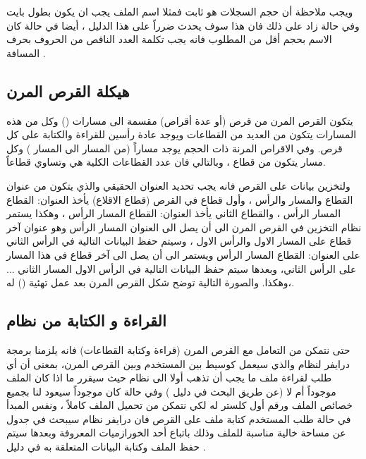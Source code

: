 \documentclass[document.tex]{subfiles}
\begin{document}
ويجب ملاحظة أن حجم السجلات هو ثابت  فمثلا اسم الملف يجب ان يكون بطول  بايت وفي حالة زاد على ذلك فان هذا سوف يحدث ضرراً على هذا الدليل ، أيضا في حالة كان الاسم بحجم أقل من المطلوب فانه يجب تكلمة العدد الناقص من الحروف بحرف المسافة .

\subsection{هيكلة القرص المرن}
يتكون القرص المرن من قرص  (أو عدة أقراص) مقسمة الى مسارات () وكل من هذه المسارات يتكون من العديد من القطاعات ويوجد عادة رأسين للقراءة والكتابة على كل قرص. وفي الاقراص المرنة ذات الحجم  يوجد  مساراً (من المسار  الى المسار ) وكل مسار يتكون من  قطاع ، وبالتالي فان عدد القطاعات الكلية هي  وتساوي  قطاعاً.

ولتخزين بيانات على القرص فانه يجب تحديد العنوان الحقيقي والذي يتكون من عنوان القطاع والمسار والرأس ، وأول قطاع في القرص (قطاع الاقلاع) يأخذ العنوان: القطاع  المسار  الرأس  ، والقطاع الثاني يأخذ العنوان: القطاع  المسار  الرأس  ، وهكذا يستمر نظام التخزين في القرص المرن الى أن يصل الى العنوان  المسار  الرأس  وهو عنوان آخر قطاع على المسار الاول والرأس الاول ، وسيتم حفظ البيانات التالية في الرأس الثاني على العنوان: القطاع  المسار  الرأس  ويستمر الى أن يصل الى آخر قطاع في هذا المسار على الرأس الثاني، وبعدها سيتم حفظ البيانات التالية في الرأس الاول المسار الثاني ... ،وهكذا. والصورة التالية توضح شكل القرص المرن بعد عمل تهئية () له.\\

\subsection{القراءة و الكتابة من نظام  }
حتى نتمكن من التعامل مع القرص المرن (قراءة وكتابة القطاعات) فانه يلزمنا برمجة درايفر  لنظام  والذي سيعمل كوسيط بين المستخدم وبين القرص المرن، بمعنى أن أي طلب لقراءة ملف ما يجب أن تذهب أولا الى نظام  حيث سيقرر ما اذا كان الملف موجوداً أم لا (عن طريق البحث في دليل ) وفي حالة كان موجوداً سيعود لنا بجميع خصائص الملف ورقم أول كلستر له لكي نتمكن من تحميل الملف كاملاً ، ونفس المبدأ في حالة طلب المستخدم كتابة ملف على القرص فان درايفر نظام  سيبحث في جدول  عن مساحة خالية مناسبة للملف وذلك باتباع أحد الخورازميات المعروفة وبعدها سيتم حفظ الملف وكتابة البيانات المتعلقة به في دليل  .
\end{document}

